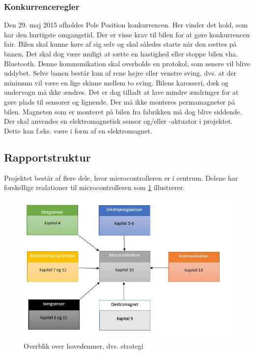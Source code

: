 \subsubsection{Konkurrenceregler}
\label{kon_regler}
Den 29. maj 2015 afholdes Pole Position konkurrencen. Her vinder det hold, som har den hurtigste omgangstid. Der er visse krav til bilen for at gøre konkurrencen fair. Bilen skal kunne køre af sig selv og skal således starte når den sættes på banen. Det skal dog være muligt at sætte en hastighed eller stoppe bilen vha. Bluetooth. Denne kommunikation skal overholde en protokol, som senere vil blive uddybet. Selve banen består kun af rene højre eller venstre sving, dvs. at der minimum vil være en lige skinne mellem to sving. Bilens karosseri, dæk og undervogn må ikke ændres. Det er dog tilladt at lave mindre ændringer for at gøre plads til sensorer og lignende. Der må ikke monteres permamagneter på bilen. Magneten som er monteret på bilen fra fabrikken må dog blive siddende. Der skal anvendes en elektromagnetisk sensor og/eller -aktuator i projektet. Dette kan f.eks. være i form af en elektromagnet. 


\subsection{Rapportstruktur}
Projektet består af flere dele, hvor microcontrolleren er i centrum. Delene har forskellige realationer til microcontrolleren som \ref{Strategi} illustrerer.\\

\begin{figure}[h!]
\center
\includegraphics[scale=0.4]{./Graphics/Strategi}
\caption{Overblik over hovedemner, dvs. strategi}
\label{Strategi}
\end{figure}


